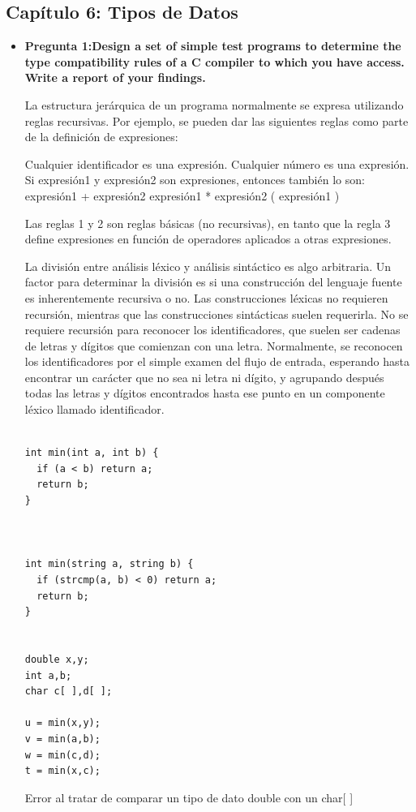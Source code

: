 \documentclass[12pt,oneside]{article}
\begin{document}
		\subsection{Capítulo 6: Tipos de Datos}
			\begin{itemize}
				\item {\bf Pregunta 1:Design a set of simple test programs to determine the type compatibility
rules of a C compiler to which you have access. Write a report of your findings.}

La estructura jerárquica de un programa normalmente se expresa utilizando reglas recursivas. Por ejemplo, se pueden dar las siguientes reglas como parte de la definición de expresiones:

    Cualquier identificador es una expresión.
    Cualquier número es una expresión.
    Si expresión1 y expresión2 son expresiones, entonces también lo son:
        expresión1 + expresión2
        expresión1 * expresión2
        ( expresión1 )

Las reglas 1 y 2 son reglas básicas (no recursivas), en tanto que la regla 3 define expresiones en función de operadores aplicados a otras expresiones.

La división entre análisis léxico y análisis sintáctico es algo arbitraria. Un factor para determinar la división es si una construcción del lenguaje fuente es inherentemente recursiva o no. Las construcciones léxicas no requieren recursión, mientras que las construcciones sintácticas suelen requerirla. No se requiere recursión para reconocer los identificadores, que suelen ser cadenas de letras y dígitos que comienzan con una letra. Normalmente, se reconocen los identificadores por el simple examen del flujo de entrada, esperando hasta encontrar un carácter que no sea ni letra ni dígito, y agrupando después todas las letras y dígitos encontrados hasta ese punto en un componente léxico llamado identificador.


\begin{lstlisting}[frame = single] 

int min(int a, int b) { 
  if (a < b) return a;
  return b;
}

	

int min(string a, string b) { 
  if (strcmp(a, b) < 0) return a;
  return b;
}


double x,y;
int a,b;
char c[ ],d[ ];

u = min(x,y);
v = min(a,b); 
w = min(c,d);
t = min(x,c); 

\end{lstlisting}
Error al tratar de comparar un tipo de
 dato double con un char[ ]


\end{itemize}
\end{document}
